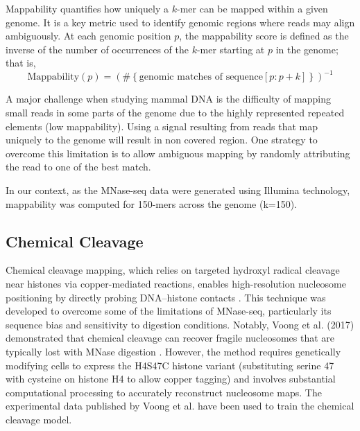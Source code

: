 \documentclass[11pt]{book}
\begin{document}
\vspace{1em}
\begin{tcolorbox}[title=Genome coverage and mappability, colframe=pink, colback=pink!10!white,coltitle=black, breakable, fonttitle=\bfseries]
\label{box:mappability}
    Mappability quantifies how uniquely a $k$-mer can be mapped within a given genome. It is a key metric used to identify genomic regions where reads may align ambiguously. 
    At each genomic position $p$, the mappability score is defined as the inverse of the number of occurrences of the $k$-mer starting at $p$ in the genome; that is,
    \[
    \text{Mappability}(p) = \left( \#\left\{ \text{genomic matches of } \text{sequence}[p:p+k] \right\} \right)^{-1}
    \]
    
    A major challenge when studying mammal DNA is the difficulty of mapping small reads in some parts of the genome due to the highly represented repeated elements (low mappability). Using a signal resulting from reads that map uniquely to the genome will result in non covered region. One strategy to overcome this limitation is to allow ambiguous mapping by randomly attributing the read to one of the best match.
    
    In our context, as the MNase-seq data were generated using Illumina technology, mappability was computed for 150-mers across the genome (k=150).
\end{tcolorbox}
\vspace{1em}

\subsection{Chemical Cleavage}
Chemical cleavage mapping, which relies on targeted hydroxyl radical cleavage near histones via copper-mediated reactions, enables high-resolution nucleosome positioning by directly probing DNA–histone contacts \cite{brogaard_chapter_2012}. This technique was developed to overcome some of the limitations of MNase-seq, particularly its sequence bias and sensitivity to digestion conditions. Notably, Voong et al. (2017) demonstrated that chemical cleavage can recover fragile nucleosomes that are typically lost with MNase digestion \cite{voong_genome-wide_2017}. However, the method requires genetically modifying cells to express the H4S47C histone variant (substituting serine 47 with cysteine on histone H4 to allow copper tagging) and involves substantial computational processing to accurately reconstruct nucleosome maps.
The experimental data published by Voong et al. have been used to train the chemical cleavage model.
\end{document}
